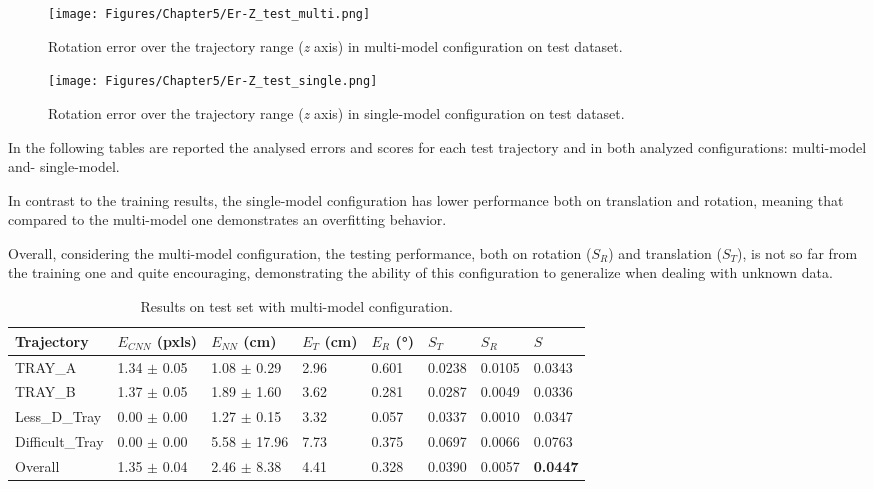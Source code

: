 \begin{figure}[H]
    \centering
    \texttt{[image: Figures/Chapter5/Er-Z\_test\_multi.png]}
    \caption[Rotation error over the trajectory range in multi-model configuration on test dataset.]{Rotation error over the trajectory range (\textit{z} axis) in multi-model configuration on test dataset.}
    \label{fig:Er test models}
\end{figure}
\begin{figure}[H]
    \centering
    \texttt{[image: Figures/Chapter5/Er-Z\_test\_single.png]}
    \caption[Rotation error over the trajectory range in single-model configuration on test dataset.]{Rotation error over the trajectory range (\textit{z} axis) in single-model configuration on test dataset.}
    \label{fig:Er test single}
\end{figure}

\newpage
In the following tables are reported the analysed errors and scores for each test trajectory and in both analyzed configurations: multi-model and- single-model.

In contrast to the training results, the single-model configuration has lower performance both on translation and rotation, meaning that compared to the multi-model one demonstrates an overfitting behavior.

Overall, considering the multi-model configuration, the testing performance, both on rotation ($S_R$) and  translation ($S_T$), is not so far from the training one and quite encouraging, demonstrating the ability of this configuration to generalize when dealing with unknown data.

\begin{table}[H]
\label{tab:multi-model test results}
\centering
\begin{tabular}{l | l l l l | l l | l}
\toprule
Trajectory & $E_{CNN}$ (pxls) & $E_{NN}$ (cm) & $E_T$ (cm)& $E_R$ (°)& $S_T$ & $S_R$ & $S$\\
\midrule
TRAY\_A & 1.34 $\pm$ 0.05 & 1.08 $\pm$ 0.29 & 2.96 & 0.601 & 0.0238 & 0.0105 & 0.0343\\
TRAY\_B & 1.37 $\pm$ 0.05 & 1.89 $\pm$ 1.60 & 3.62 & 0.281 & 0.0287 & 0.0049 & 0.0336\\
Less\_D\_Tray & 0.00 $\pm$ 0.00 & 1.27 $\pm$ 0.15 & 3.32 & 0.057 & 0.0337 & 0.0010 & 0.0347\\
Difficult\_Tray & 0.00 $\pm$ 0.00 & 5.58 $\pm$ 17.96 & 7.73 & 0.375 & 0.0697 & 0.0066 & 0.0763\\
\midrule
Overall & 1.35 $\pm$ 0.04 & 2.46 $\pm$ 8.38 & 4.41 & 0.328 & 0.0390 & 0.0057 & \textbf{0.0447}\\
\bottomrule
\end{tabular}
\caption{Results on test set with multi-model configuration.}
\end{table}

